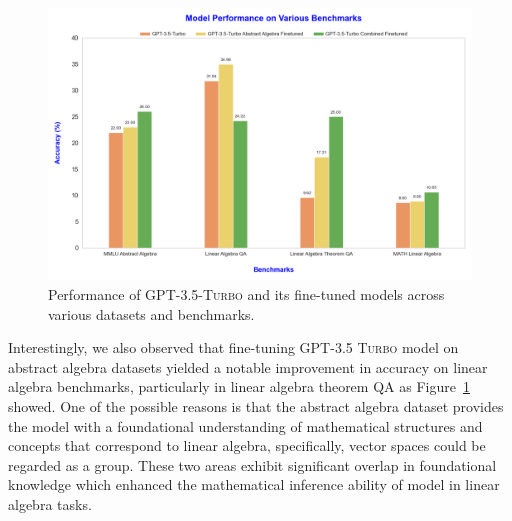 \documentclass[10pt]{article}
\begin{document}
\begin{figure}[h]
    \centering
    \includegraphics[width=0.8\linewidth]{Figures/GPT-3.5-Turbo_Performance_on_Various_Benchmarks.png}
    \caption{Performance of \textsc{GPT-3.5-Turbo} and its fine-tuned models across various datasets and benchmarks.}
    \label{fig:Observation}
\end{figure}
 
Interestingly, we also observed that fine-tuning \textsc{GPT-3.5 Turbo} model on abstract algebra datasets yielded a notable improvement in accuracy on linear algebra benchmarks, particularly in linear algebra theorem QA as  Figure~\ref{fig:Observation} showed. One of the possible reasons is that the abstract algebra dataset provides the model with a foundational understanding of mathematical structures and concepts that correspond to linear algebra, specifically, vector spaces could be regarded as a group. These two areas exhibit significant overlap in foundational knowledge which enhanced the mathematical inference ability of model in linear algebra tasks.\\ 
\end{document}
